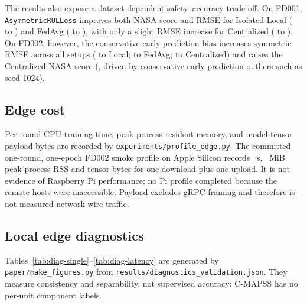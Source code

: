 The results also expose a dataset-dependent safety--accuracy trade-off. On FD001, \texttt{AsymmetricRULLoss} improves both NASA score and RMSE for Isolated Local (\AsymFdOneLocalMseRmse{} to \AsymFdOneLocalAsyRmse{}) and FedAvg (\AsymFdOneFedMseRmse{} to \AsymFdOneFedAsyRmse{}), with only a slight RMSE increase for Centralized (\AsymFdOneCentMseRmse{} to \AsymFdOneCentAsyRmse{}). On FD002, however, the conservative early-prediction bias increases symmetric RMSE across all setups (\AsymFdTwoLocalMseRmse{} to \AsymFdTwoLocalAsyRmse{} Local; \AsymFdTwoFedMseRmse{} to \AsymFdTwoFedAsyRmse{} FedAvg; \AsymFdTwoCentMseRmse{} to \AsymFdTwoCentAsyRmse{} Centralized) and raises the Centralized NASA score (\AsymFdTwoCentNasaDelta{}, driven by conservative early-prediction outliers such as seed 1024).

\subsection{Edge cost}
Per-round CPU training time, peak process resident memory, and model-tensor payload bytes are recorded by \texttt{experiments/profile\_edge.py}. The committed one-round, one-epoch FD002 smoke profile on Apple Silicon records \EdgeSmokeTrainSeconds{}~s, \EdgeSmokePeakRssMiB{}~MiB peak process RSS and \EdgeSmokePayloadBytes{} tensor bytes for one download plus one upload. It is not evidence of Raspberry Pi performance; no Pi profile completed because the remote hosts were inaccessible. Payload excludes gRPC framing and therefore is not measured network wire traffic.

\subsection{Local edge diagnostics}
\label{sec:results-diag}
Tables~\ref{tab:diag-single}--\ref{tab:diag-latency} are generated by \texttt{paper/make\_figures.py} from \texttt{results/diagnostics\_validation.json}. They measure consistency and separability, not supervised accuracy: C-MAPSS has no per-unit component labels.

\begin{table}[t]
\centering
\caption{Single-fault consistency on FD001/FD002 windows with true RUL $y<30$ (mean $\pm$ sample std over \DiagNumSeeds{} seeds; a single value means zero spread). ``Core'' is HPC $\cup$ Turbine. Chance is the sensor-count rate. Drift is model-free; it varies across seeds only because the held-out engines change.}
\label{tab:diag-single}
\footnotesize

\end{table}

